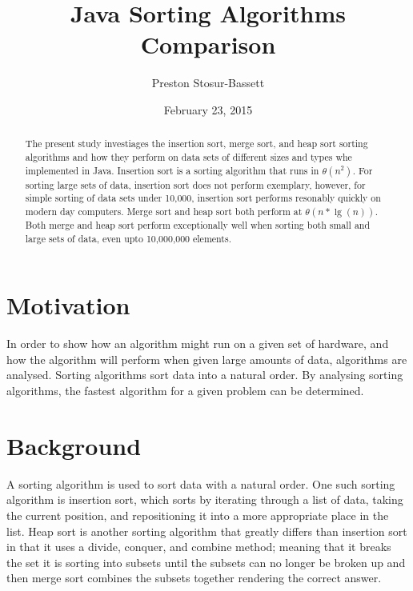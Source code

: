 \documentclass[onecolumn, 12pt, article]{IEEEtran}
\numberwithin{case}{problem}
\numberwithin{condition}{problem}
\numberwithin{condition}{subsection}
\numberwithin{definition}{section}
\theoremstyle{remark}
\numberwithin{question}{problem}
\theoremstyle{plain}
\numberwithin{answer}{problem}
\numberwithin{solution}{section}
\numberwithin{equation}{section}%
\begin{document}
\title{Java Sorting Algorithms Comparison}
\author{Preston Stosur-Bassett}
\date{February 23, 2015}
\maketitle

\pagestyle{fancy}

\begin{abstract}
The present study investiages the insertion sort, merge sort, and heap sort sorting algorithms and how they perform on data sets of different sizes and types whe implemented in Java. Insertion sort is a sorting algorithm that runs in $ \theta(n^2) $. For sorting large sets of data, insertion sort does not perform exemplary, however, for simple sorting of data sets under 10,000, insertion sort performs resonably quickly on modern day computers. Merge sort and heap sort both perform at $ \theta(n*\lg(n)) $. Both merge and heap sort perform exceptionally well when sorting both small and large sets of data, even upto 10,000,000 elements.
\end{abstract}

\section{Motivation}
In order to show how an algorithm might run on a given set of hardware, and how the algorithm will perform when given large amounts of data, algorithms are analysed. Sorting algorithms sort data into a natural order. By analysing sorting algorithms, the fastest algorithm for a given problem can be determined. 

\section{Background}
A sorting algorithm is used to sort data with a natural order. One such sorting algorithm is insertion sort, which sorts by iterating through a list of data, taking the current position, and repositioning it into a more appropriate place in the list. Heap sort is another sorting algorithm that greatly differs than insertion sort in that it uses a divide, conquer, and combine method; meaning that it breaks the set it is sorting into subsets until the subsets can no longer be broken up and then merge sort combines the subsets together rendering the correct answer. %
\end{document}
